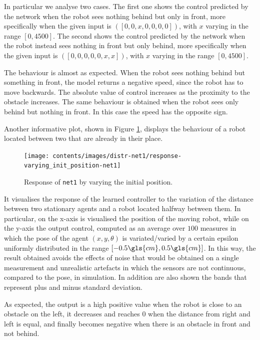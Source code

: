 In particular we analyse two cases. The first one shows the control predicted by 
the network when the robot sees nothing behind but only in front, more 
specifically when the given input is  $([0, 0, x, 0, 0, 0, 0])$, with $x$ varying in the 
range $[0, 4500]$.
The second shows the control predicted by the network when the robot instead 
sees nothing in front but only behind, more specifically when the given input is  
$([0, 0, 0, 0, 0,x , x])$, with $x$ varying in the range $[0, 4500]$.

The behaviour is almost as expected. When the robot sees nothing behind but 
something in front, the model returns a negative speed, since the robot has to 
move backwards. 
The absolute value of control increases as the proximity to the obstacle increases.
The same behaviour is obtained when the robot sees only behind but nothing in 
front. In this case the speed has the opposite sign.

Another informative plot, shown in Figure \ref{fig:net1responseposition}, displays 
the behaviour of a robot located between two that are already in their place.
\begin{figure}[!htb]
	\centering
	\texttt{[image: contents/images/distr-net1/response-varying\_init\_position-net1]}%
	\caption{Response of \texttt{net1} by varying the initial position.}
	\label{fig:net1responseposition}
\end{figure}

It visualises the response of the learned controller to the variation of the distance 
between two stationary agents and a robot located halfway between them.
In particular, on the x-axis is visualised the position of the moving robot, while on 
the y-axis the output control, computed as an average over $100$ measures in 
which the pose of the agent $(x, y, \theta)$ is variated/varied by a certain epsilon 
uniformly distributed in the range $[-0.5\gls{cm}, 0.5\gls{cm}]$. In this way, the 
result obtained avoids the effects of noise that would be obtained on a single 
measurement and unrealistic artefacts in which the sensors are not continuous, 
compared to the pose, in simulation. In addition are also shown the bands that 
represent plus and minus standard deviation.

As expected, the output is a high positive value when the robot is close to an 
obstacle on the left, it decreases and reaches $0$ when the distance from right 
and left is equal, and finally becomes negative when there is an obstacle in front 
and not behind.

